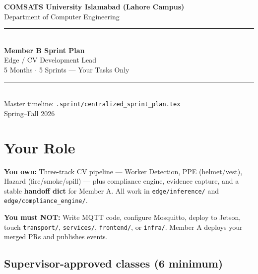 \documentclass[12pt,a4paper]{article}
\begin{document}

\begin{titlepage}
\centering
\vspace*{1cm}
{\Large\color{primary}\textbf{COMSATS University Islamabad (Lahore Campus)}}\\[0.2cm]
{\large Department of Computer Engineering}\\[0.5cm]
\rule{\textwidth}{2pt}\\[0.8cm]
{\Huge\bfseries\color{memberb} Member B Sprint Plan}\\[0.4cm]
{\Large Edge / CV Development Lead}\\[0.2cm]
{\large 5 Months $\cdot$ 5 Sprints --- Your Tasks Only}\\[0.3cm]
\rule{\textwidth}{2pt}\\[1cm]
{\small Master timeline: \texttt{.sprint/centralized\_sprint\_plan.tex}}\\
\vfill
{\large Spring--Fall 2026}
\end{titlepage}

\tableofcontents
\newpage

\section{Your Role}

\begin{scopebox}
\textbf{You own:} Three-track CV pipeline --- Worker Detection, PPE (helmet/vest), Hazard (fire/smoke/spill) --- plus compliance engine, evidence capture, and a stable \textbf{handoff dict} for Member A. All work in \texttt{edge/inference/} and \texttt{edge/compliance\_engine/}.
\end{scopebox}

\begin{outofscopebox}
\textbf{You must NOT:} Write MQTT code, configure Mosquitto, deploy to Jetson, touch \texttt{transport/}, \texttt{services/}, \texttt{frontend/}, or \texttt{infra/}. Member A deploys your merged PRs and publishes events.
\end{outofscopebox}

\subsection{Supervisor-approved classes (6 minimum)}
\end{document}
